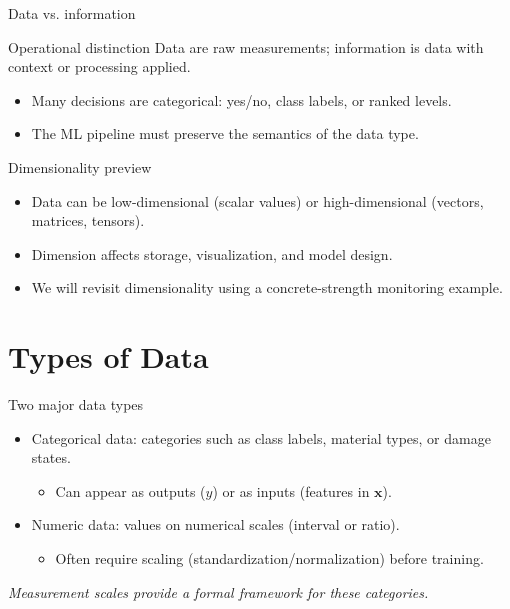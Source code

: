 \documentclass[12pt]{beamer}
\begin{document}
\begin{frame}{Data vs. information}
  \begin{conceptbox}{Operational distinction}
    Data are raw measurements; information is data with context or processing applied.
  \end{conceptbox}
  \begin{itemize}
    \item Many decisions are categorical: yes/no, class labels, or ranked levels.
    \item The ML pipeline must preserve the semantics of the data type.
  \end{itemize}
\end{frame}

\begin{frame}{Dimensionality preview}
  \begin{itemize}
    \item Data can be low-dimensional (scalar values) or high-dimensional (vectors, matrices, tensors).
    \item Dimension affects storage, visualization, and model design.
    \item We will revisit dimensionality using a concrete-strength monitoring example.
  \end{itemize}
\end{frame}

\section{Types of Data}

\begin{frame}{Two major data types}
  \begin{itemize}
    \item Categorical data: categories such as class labels, material types, or damage states.
      \begin{itemize}
        \item Can appear as outputs ($y$) or as inputs (features in $\bm{x}$).
      \end{itemize}
    \item Numeric data: values on numerical scales (interval or ratio).
      \begin{itemize}
        \item Often require scaling (standardization/normalization) before training.
      \end{itemize}
  \end{itemize}
  \vspace{0.3em}
  \textit{Measurement scales provide a formal framework for these categories.}
\end{frame}
\end{document}
